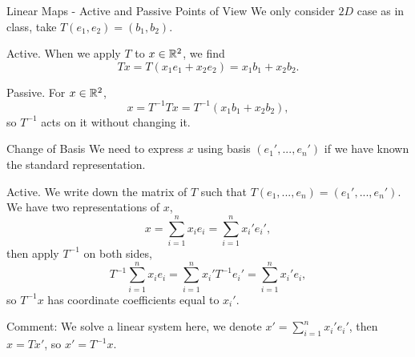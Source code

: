 \documentclass[hyperref={pdfpagelabels=true}]{beamer}
\newcommand{\<}{\langle}
\renewcommand{\>}{\rangle}
\newenvironment{shrinkeq}[1]%
{ \bgroup
  \addtolength\abovedisplayshortskip{#1}
  \addtolength\abovedisplayskip{#1}
  \addtolength\belowdisplayshortskip{#1}
  \addtolength\belowdisplayskip{#1}}
{\egroup\ignorespacesafterend}
\begin{document}
\begin{frame}{Linear Maps - Active and Passive Points of View}
    We only consider $2D$ case as in class, take $T(e_{1},e_{2}) = (b_{1},b_{2})$.
    \begin{block}{Active.}
        When we apply $T$ to $x \in \mathbb{R}^{2}$, we find 
        \[Tx = T(x_{1}e_{1}+x_{2}e_{2}) = x_{1}b_{1}+x_{2}b_{2}.\]
    \end{block}
    \begin{block}{Passive.}
        For $x \in \mathbb{R}^{2}$, 
        \[x = T^{-1}Tx = T^{-1}(x_{1}b_{1}+x_{2}b_{2}),\]
        so $T^{-1}$ acts on it without changing it.
    \end{block}
\end{frame}
\begin{frame}{Change of Basis}
    We need to express $x$ using basis $(e_{1}',...,e_{n}')$ if we have known the standard representation.
    \begin{block}{Active.}
        We write down the matrix of $T$ such that $T(e_{1},...,e_{n}) = (e_{1}',...,e_{n}')$.
        We have two representations of $x$,
        \begin{shrinkeq}{-0.3em}
        \[x = \sum_{i = 1}^{n}x_{i}e_{i} = \sum_{i = 1}^{n}x_{i}'e_{i}',\]
        \end{shrinkeq}
        then apply $T^{-1}$ on both sides,
        \begin{shrinkeq}{-0.3em}
        \[T^{-1}\sum_{i = 1}^{n}x_{i}e_{i} = \sum_{i = 1}^{n}x_{i}'T^{-1}e_{i}' = \sum_{i = 1}^{n}x_{i}'e_{i},\]
        \end{shrinkeq}
        so $T^{-1}x$ has coordinate coefficients equal to $x_{i}'$.
    \end{block}
    \begin{block}{Comment:}
        We solve a linear system here, we denote $x' = \sum_{i = 1}^{n}x_{i}'e_{i}'$, then $x = Tx'$, so $x' = T^{-1}x$.
    \end{block}
\end{frame}
\end{document}

